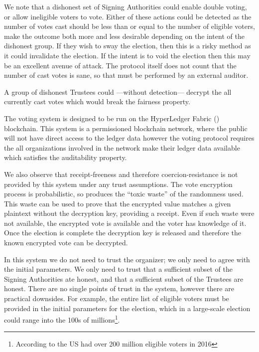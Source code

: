 We note that a dishonest set of Signing Authorities could enable double voting, or allow ineligible voters to vote. Either of these actions could be detected as the number of votes cast should be less than or equal to the number of eligible voters, make the outcome both more and less desirable depending on the intent of the dishonest group. If they wish to sway the election, then this is a risky method as it could invalidate the election. If the intent is to void the election then this may be an excellent avenue of attack. The protocol itself does not count that the number of cast votes is sane, so that must be performed by an external auditor.

A group of dishonest Trustees could ---without detection--- decrypt the all currently cast votes which would break the fairness property.

The voting system is designed to be run on the HyperLedger Fabric () blockchain. This system is a permissioned blockchain network, where the public will not have direct access to the ledger data however the voting protocol requires the all organizations involved in the network make their ledger data available which satisfies the auditability property.

We also observe that receipt-freeness and therefore coercion-resistance is not provided by this system under any trust assumptions. The vote encryption process is probabilistic, so produces the ``toxic waste'' of the randomness used. This waste can be used to prove that the encrypted value matches a given plaintext without the decryption key, providing a receipt. Even if such waste were not available, the encrypted vote is available and the voter has knowledge of it. Once the election is complete the decryption key is released and therefore the known encrypted vote can be decrypted.

In this system we do not need to trust the organizer; we only need to agree with the initial parameters. We only need to trust that a sufficient subset of the Signing Authorities ate honest, and that a sufficient subset of the Trustees are honest. There are no single points of trust in the system, however there are practical downsides. For example, the entire list of eligible voters must be provided in the initial parameters for the election, which in a large-scale election could range into the 100s of millions\footnote{According to  the US had over 200 million eligible voters in 2016}.





